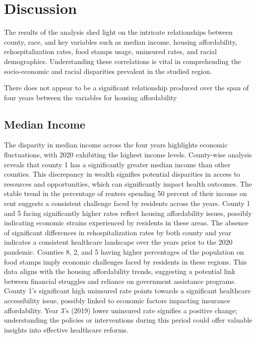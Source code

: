 \documentclass[12pt]{article}
\begin{document}
\section{Discussion}\label{sec:disc}

The results of the analysis shed light on the intricate relationships between county, race, and key 
variables such as median income, housing affordability, rehospitalization rates, food stamps usage, 
uninsured rates, and racial demographics. Understanding these correlations is vital in comprehending 
the socio-economic and racial disparities prevalent in the studied region.

There does not appear to be a significant relationship produced over the span of four years between the variables for housing affordability

\subsection{Median Income}
The disparity in median income across the four years highlights economic fluctuations, with 
2020 exhibiting the highest income levels. County-wise analysis reveals that county 1 has a significantly 
greater median income than other counties. This discrepancy in wealth signifies potential disparities in 
access to resources and opportunities, which can significantly impact health outcomes. The stable trend 
in the percentage of renters spending 50 percent of their income on rent suggests a 
consistent challenge faced by residents across the years. County 1 and 5 facing significantly higher 
rates reflect housing affordability issues, possibly indicating economic strains experienced by residents in these areas.
The absence of significant differences in rehospitalization rates by both county and year indicates 
a consistent healthcare landscape over the years prior to the 2020 pandemic.
Counties 8, 2, and 5 having higher percentages of the population on food stamps imply economic challenges 
faced by residents in these regions. This data aligns with the housing affordability trends, suggesting a potential 
link between financial struggles and reliance on government assistance programs.
County 1's significant high uninsured rate points towards a significant healthcare accessibility issue, 
possibly linked to economic factors impacting insurance affordability. Year 3's (2019) lower uninsured rate signifies 
a positive change; understanding the policies or interventions during this period could offer valuable insights into 
effective healthcare reforms.
\end{document}
